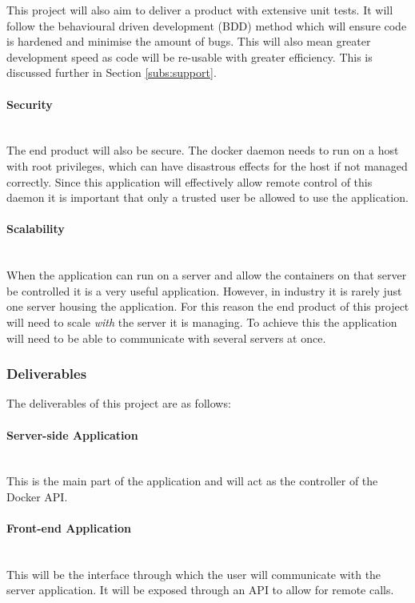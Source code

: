 This project will also aim to deliver a product with extensive unit tests. It will follow the behavioural driven development (BDD) method which will ensure code is hardened and minimise the amount of bugs. This will also mean greater development speed as code will be re-usable with greater efficiency. This is discussed further in Section \ref{subs:support}.

\paragraph{Security}\mbox{}\\
The end product will also be secure. The \gls{docker daemon} needs to run on a host with root privileges, which can have disastrous effects for the host if not managed correctly. Since this application will effectively allow remote control of this daemon it is important that only a trusted user be allowed to use the application. 

\paragraph{Scalability}\mbox{}\\
When the application can run on a server and allow the containers on that server be controlled it is a very useful application. However, in industry it is rarely just one server housing the application. For this reason the end product of this project will need to scale \textit{with} the server it is managing. To achieve this the application will need to be able to communicate with several servers at once.

\subsubsection{Deliverables}
The deliverables of this project are as follows:

\paragraph{Server-side Application}\mbox{}\\
This is the main part of the application and will act as the controller of the Docker \gls{API}.

\paragraph{Front-end Application}\mbox{}\\
This will be the interface through which the user will communicate with the server application. It will be exposed through an API to allow for remote calls.

